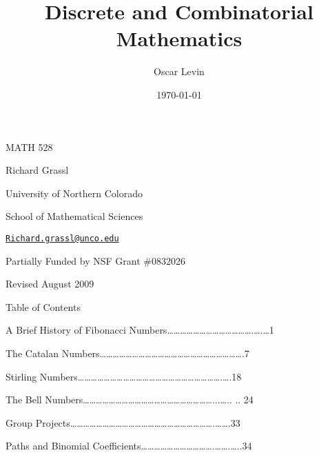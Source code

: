 \documentclass[10pt,letter]{article}
\begin{document}
\title{Discrete and Combinatorial Mathematics}



\author[1]{Oscar Levin}%
%


\vspace{-1em}



  \date{\today}


\begingroup
\let\center\flushleft
\let\endcenter\endflushleft
\maketitle
\endgroup








MATH 528

Richard Grassl

University of Northern Colorado

School of Mathematical Sciences

\href{mailto:Richard.grassl@unco.edu}{\nolinkurl{Richard.grassl@unco.edu}}

Partially Funded by NSF Grant \#0832026

Revised August 2009

Table of Contents

A Brief History of Fibonacci
Numbers\ldots{}\ldots{}\ldots{}\ldots{}\ldots{}\ldots{}\ldots{}\ldots{}\ldots{}\ldots{}\ldots{}\ldots{}\ldots{}.\ldots{}.\ldots{}1

The Catalan
Numbers\ldots{}\ldots{}\ldots{}\ldots{}\ldots{}\ldots{}\ldots{}\ldots{}\ldots{}\ldots{}\ldots{}\ldots{}\ldots{}\ldots{}\ldots{}\ldots{}\ldots{}\ldots{}\ldots{}\ldots{}\ldots{}\ldots{}.7

Stirling
Numbers\ldots{}\ldots{}\ldots{}\ldots{}\ldots{}\ldots{}\ldots{}\ldots{}\ldots{}\ldots{}\ldots{}\ldots{}\ldots{}\ldots{}\ldots{}\ldots{}\ldots{}\ldots{}\ldots{}\ldots{}\ldots{}\ldots{}.\ldots{}.18

The Bell
Numbers\ldots{}\ldots{}\ldots{}\ldots{}\ldots{}\ldots{}\ldots{}\ldots{}\ldots{}\ldots{}\ldots{}\ldots{}\ldots{}\ldots{}\ldots{}\ldots{}\ldots{}\ldots{}\ldots{}\ldots{}...\ldots{}..
.. 24

Group
Projects\ldots{}\ldots{}\ldots{}\ldots{}\ldots{}\ldots{}\ldots{}\ldots{}\ldots{}\ldots{}\ldots{}\ldots{}\ldots{}\ldots{}\ldots{}\ldots{}\ldots{}\ldots{}\ldots{}\ldots{}\ldots{}\ldots{}.\ldots{}\ldots{}.33

Paths and Binomial
Coefficients\ldots{}\ldots{}\ldots{}\ldots{}\ldots{}\ldots{}\ldots{}\ldots{}\ldots{}\ldots{}\ldots{}.\ldots{}\ldots{}.\ldots{}..34
\end{document}
